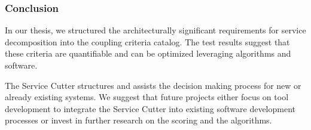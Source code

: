 \subsubsection{Conclusion}
In our thesis, we structured the architecturally significant requirements for service decomposition into the coupling criteria catalog. The test results suggest that these criteria are quantifiable and can be optimized leveraging algorithms and software. 

The Service Cutter structures and assists the decision making process for new or already existing systems. We suggest that future projects either focus on tool development to integrate the Service Cutter into existing software development processes or invest in further research on the scoring and the algorithms. 
